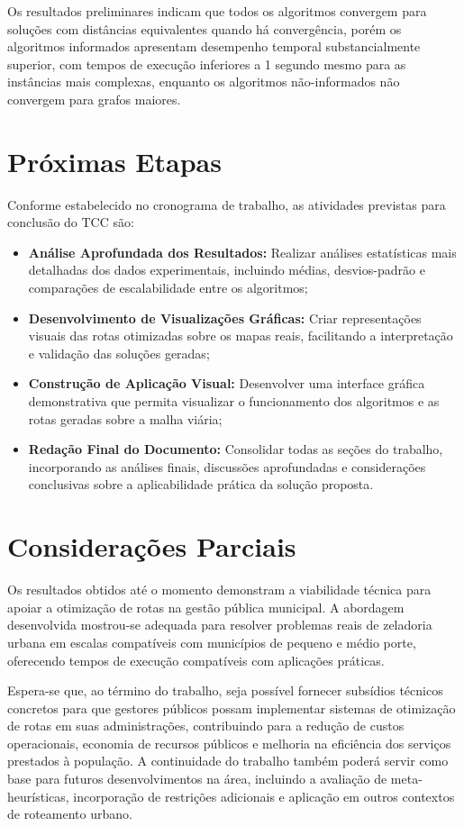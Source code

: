 Os resultados preliminares indicam que todos os algoritmos convergem para soluções com distâncias 
equivalentes quando há convergência, porém os algoritmos informados apresentam desempenho temporal 
substancialmente superior, com tempos de execução inferiores a 1 segundo mesmo para as instâncias 
mais complexas, enquanto os algoritmos não-informados não convergem para grafos maiores.

\section{Próximas Etapas}

Conforme estabelecido no cronograma de trabalho, as atividades previstas para conclusão do TCC são:

\begin{itemize}
    \item \textbf{Análise Aprofundada dos Resultados:} Realizar análises estatísticas mais 
    detalhadas dos dados experimentais, incluindo médias, desvios-padrão e comparações de 
    escalabilidade entre os algoritmos;
    
    \item \textbf{Desenvolvimento de Visualizações Gráficas:} Criar representações visuais das 
    rotas otimizadas sobre os mapas reais, facilitando a interpretação e validação das soluções 
    geradas;
    
    \item \textbf{Construção de Aplicação Visual:} Desenvolver uma interface gráfica demonstrativa 
    que permita visualizar o funcionamento dos algoritmos e as rotas geradas sobre a malha viária;
    
    \item \textbf{Redação Final do Documento:} Consolidar todas as seções do trabalho, incorporando 
    as análises finais, discussões aprofundadas e considerações conclusivas sobre a aplicabilidade 
    prática da solução proposta.
\end{itemize}

\section{Considerações Parciais}

Os resultados obtidos até o momento demonstram a viabilidade técnica para apoiar a
otimização de rotas na gestão pública municipal. A abordagem desenvolvida 
mostrou-se adequada para resolver problemas reais de zeladoria urbana em escalas compatíveis com 
municípios de pequeno e médio porte, oferecendo tempos de execução compatíveis com aplicações 
práticas.

Espera-se que, ao término do trabalho, seja possível fornecer subsídios técnicos concretos para 
que gestores públicos possam implementar sistemas de otimização de rotas em suas administrações, 
contribuindo para a redução de custos operacionais, economia de recursos públicos e melhoria na 
eficiência dos serviços prestados à população. A continuidade do trabalho também poderá servir 
como base para futuros desenvolvimentos na área, incluindo a avaliação de meta-heurísticas, 
incorporação de restrições adicionais e aplicação em outros contextos de roteamento urbano.


